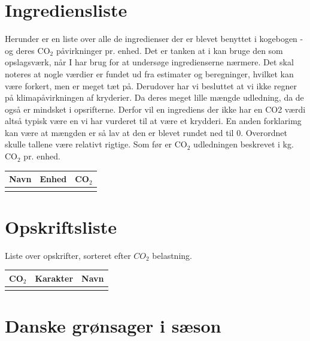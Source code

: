 \documentclass[11pt, a4paper]{article}
\newcommand{\coo}{CO$_2$ }
\begin{document}
\newpage
\tableofcontents

\vspace{5em}
\newpage


	
\newpage

\section{Ingrediensliste}


Herunder er en liste over alle de ingredienser der er blevet benyttet i kogebogen - og deres \coo påvirkninger pr. enhed. Det er tanken at i kan bruge den som opslagsværk, når I har brug for at undersøge ingredienserne nærmere. Det skal noteres at nogle værdier er fundet ud fra estimater og beregninger, hvilket kan være forkert, men er meget tæt på. Derudover har vi besluttet at vi ikke regner på klimapåvirkningen af kryderier. Da deres meget lille mængde udledning, da de også er mindsket i opsrifterne. Derfor vil en ingrediens der ikke har en CO2 værdi altså typisk være en vi har vurderet til at være et krydderi. En anden forklarimg kan være at mængden er så lav at den er blevet rundet ned til 0. Overordnet skulle tallene være relativt rigtige. Som før er \coo udledningen beskrevet i kg. \coo pr. enhed.



	\begin{longtable}{|l|l|l|}
		\hline
\textbf{Navn} & \textbf{Enhed} & \textbf{\coo}\\ \hline
\rucooingredients		
	\end{longtable}

\newpage
\section{Opskriftsliste}

Liste over opskrifter, sorteret efter $CO_2$ belastning.

\begin{longtable}{|l|l|l|}
	\hline
	\textbf{\coo} & \textbf{Karakter} & \textbf{Navn}\\ \hline
	\rucoorecipes		
\end{longtable}

\newpage
\section{Danske grønsager i sæson}
\end{document}
